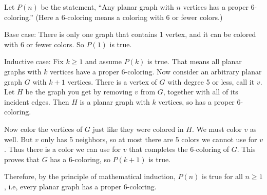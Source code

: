 \protect \documentclass [10pt]{exam}
\renewenvironment{Ans}[1]{\setcounter{question}{#1}\addtocounter{question}{-1}\question }{}
\begin{document}
\begin{questions}
\begin{Ans}{24}
  	
\end{Ans}
\begin{Ans}{25}
  Let $P(n)$ be the statement, ``Any planar graph with $n$ vertices has a proper 6-coloring.''  (Here a 6-coloring means a coloring with 6 or fewer colors.)

  Base case: There is only one graph that contains 1 vertex, and it can be colored with 6 or fewer colors.  So $P(1)$ is true.

  Inductive case: Fix $k \ge 1$ and assume $P(k)$ is true.  That means all planar graphs with $k$ vertices have a proper 6-coloring.  Now consider an arbitrary planar graph $G$ with $k+1$ vertices.  There is a vertex of $G$ with degree 5 or less, call it $v$.  Let $H$ be the graph you get by removing $v$ from $G$, together with all of its incident edges.  Then $H$ is a planar graph with $k$ vertices, so has a proper 6-coloring.

  Now color the vertices of $G$ just like they were colored in $H$.  We must color $v$ as well.  But $v$ only has 5 neighbors, so at most there are 5 colors we cannot use for $v$.  Thus there is a color we can use for $v$ that completes the 6-coloring of $G$.  This proves that $G$ has a 6-coloring, so $P(k+1)$ is true.

  Therefore, by the principle of mathematical induction, $P(n)$ is true for all $n \ge 1$, i.e, every planar graph has a proper 6-coloring.
\end{Ans}
\begin{Ans}{26}
\end{Ans}
\end{questions}
\end{document}
